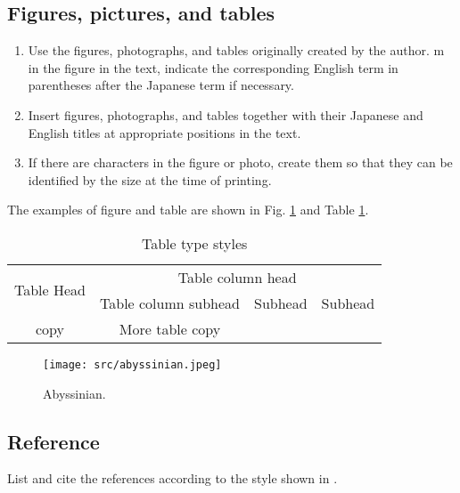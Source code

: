 \subsection{Figures, pictures, and tables}

\begin{enumerate}
    \item Use the figures, photographs, and tables originally created by the author. m in the figure in the text, indicate the corresponding English term in parentheses after the Japanese term if necessary.
    \item Insert figures, photographs, and tables together with their Japanese and English titles at appropriate positions in the text.
    \item If there are characters in the figure or photo, create them so that they can be identified by the size at the time of printing.
\end{enumerate}

The examples of figure and table are shown in Fig. \ref{fig:abyssinian} and Table \ref{tab:table}.

\begin{table}[t]
    \centering
    \caption{Table type styles}
    \begin{tabular}{c|c|c|c} \hline
        \multirow{2}{1cm}{Table Head} & \multicolumn{3}{|c}{Table column head} \\ \cline{2-4}
         & Table column subhead & Subhead & Subhead \\ \hline\hline
        copy & More table copy & & \\ \hline
    \end{tabular}
    \label{tab:table}
\end{table}

\begin{figure}[t]
    \centering
    \texttt{[image: src/abyssinian.jpeg]}
    \caption{Abyssinian.}
    \label{fig:abyssinian}
\end{figure}

\subsection{Reference}
List and cite the references according to the style shown in
\cite{NIPS2012_c399862d}.